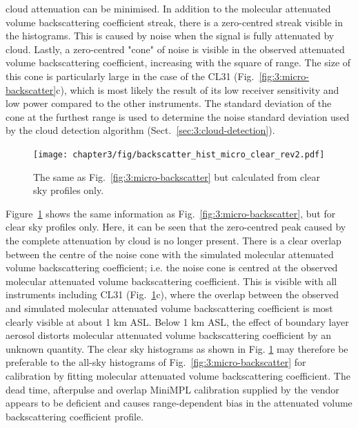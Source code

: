 cloud attenuation can be minimised.
In addition to the molecular attenuated volume backscattering coefficient streak,
there is a zero-centred streak visible in the histograms. This is caused
by noise when the signal is fully attenuated by cloud. Lastly, a zero-centred
"cone" of noise is visible in the observed attenuated volume backscattering coefficient, increasing with the
square of range. The size of this cone is particularly large in the case
of the CL31 (Fig.~\ref{fig:3:micro-backscatter}c), which is most likely the result
of its low receiver sensitivity and low power compared to the other
instruments. The standard deviation of the cone at the furthest range
is used to determine the noise standard deviation used by the cloud
detection algorithm (Sect.~\ref{sec:3:cloud-detection}).

\begin{figure}[t]
\centerline{\texttt{[image: chapter3/fig/backscatter\_hist\_micro\_clear\_rev2.pdf]}}
\caption[The same as Fig.~\ref{fig:3:micro-backscatter} but calculated from clear
sky profiles only]{
The same as Fig.~\ref{fig:3:micro-backscatter} but calculated from clear
sky profiles only.
}
\label{fig:3:micro-backscatter-clear}
\end{figure}

Figure~\ref{fig:3:micro-backscatter-clear} shows the same information as Fig.~\ref{fig:3:micro-backscatter},
but for clear sky profiles only. Here, it can be seen that the zero-centred
peak caused by the complete attenuation by cloud is no longer present.
There is a clear overlap between the centre of the noise cone
with the simulated molecular attenuated volume backscattering coefficient; i.e. the noise cone is centred
at the observed molecular attenuated volume backscattering coefficient. This is visible with all instruments
including CL31 (Fig.~\ref{fig:3:micro-backscatter-clear}c), where the overlap between
the observed and simulated molecular attenuated volume backscattering coefficient is most clearly visible at about 1 km ASL.
Below 1 km ASL,
the effect of boundary layer aerosol distorts molecular attenuated volume backscattering coefficient
by an unknown quantity. The clear sky histograms as shown in Fig.
\ref{fig:3:micro-backscatter-clear} may therefore be preferable to the all-sky
histograms of Fig.~\ref{fig:3:micro-backscatter} for calibration by fitting
molecular attenuated volume backscattering coefficient.
The dead time, afterpulse and overlap MiniMPL
calibration supplied by the vendor appears to be deficient and causes
range-dependent bias in the attenuated volume backscattering coefficient profile.

